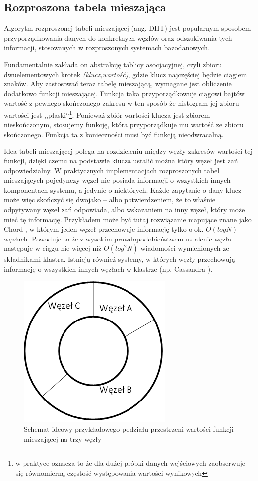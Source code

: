 \documentclass[a4paper,polish,12pt,twoside]{article}
\begin{document}
	\subsection{Rozproszona tabela mieszająca}
	\label{sec:dht}
Algorytm rozproszonej tabeli mieszającej (ang. DHT) jest popularnym sposobem przyporządkowania danych do konkretnych węzłów oraz odszukiwania tych informacji, stosowanych w rozproszonych systemach bazodanowych.

Fundamentalnie zakłada on abstrakcję tablicy asocjacyjnej, czyli zbioru dwuelementowych krotek \textit{(klucz,wartość)}, gdzie klucz najczęściej będzie ciągiem znaków. Aby zastosować teraz tabelę mieszającą, wymagane jest obliczenie dodatkowo funkcji mieszającej. Funkcja taka przyporządkowuje ciągowi bajtów wartość z pewnego skończonego zakresu w ten sposób że histogram jej zbioru wartości jest ,,płaski``\footnote{w praktyce oznacza to że dla dużej próbki danych wejściowych zaobserwuje się równomierną częstość występowania wartości wynikowych}. Ponieważ zbiór wartości klucza jest zbiorem nieskończonym, stosujemy funkcję, która przyporządkuje mu wartość ze zbioru skończonego. Funkcja ta z konieczności musi być funkcją nieodwracalną.

Idea tabeli mieszającej polega na rozdzieleniu między węzły zakresów wartości tej funkcji, dzięki czemu na podstawie klucza ustalić można który węzeł jest zań odpowiedzialny. W praktycznych implementacjach rozproszonych tabel mieszających pojedynczy węzeł nie posiada informacji o wszystkich innych komponentach systemu, a jedynie o niektórych. Każde zapytanie o dany klucz może więc skończyć się dwojako – albo potwierdzeniem, że to właśnie odpytywany węzeł zań odpowiada, albo wskazaniem na inny węzeł, który może mieć tę informację. Przykładem może być tutaj rozwiązanie mapujące znane jako Chord \cite{Stoica:2001:CSP:383059.383071}, w którym jeden węzeł przechowuje informację tylko o ok. $O(log N)$ węzłach. Powoduje to że z wysokim prawdopodobieństwem ustalenie węzła następuje w ciągu nie więcej niż $O(log^2 N)$ wiadomości wymienionych ze składnikami klastra. Istnieją również systemy, w których węzły przechowują informację o wszystkich innych węzłach w klastrze (np. Cassandra \cite{Lakshman:2010:CDS:1773912.1773922}).

	\begin{figure}[h]
		\centering \includegraphics{sch_ide_token_ring}
		\caption{Schemat ideowy przykładowego podziału przestrzeni wartości funkcji mieszającej na trzy węzły}
		\label{fig:sch_ide_token_ring}
	\end{figure}
\end{document}
